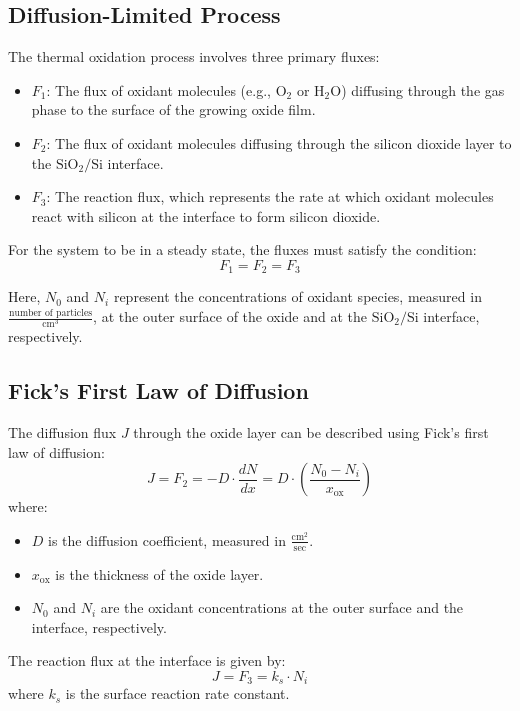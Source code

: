 \documentclass{report}
\begin{document}
\subsection{Diffusion-Limited Process}

The thermal oxidation process involves three primary fluxes:

\begin{itemize}
    \item $F_1$: The flux of oxidant molecules (e.g., $\text{O}_2$ or $\text{H}_2\text{O}$) diffusing through the gas phase to the surface of the growing oxide film.
    \item $F_2$: The flux of oxidant molecules diffusing through the silicon dioxide layer to the $\text{SiO}_2/\text{Si}$ interface.
    \item $F_3$: The reaction flux, which represents the rate at which oxidant molecules react with silicon at the interface to form silicon dioxide.
\end{itemize}

For the system to be in a steady state, the fluxes must satisfy the condition:
$$
F_1 = F_2 = F_3
$$

Here, $N_0$ and $N_i$ represent the concentrations of oxidant species, measured in $\frac{\text{number of particles}}{\text{cm}^3}$, at the outer surface of the oxide and at the $\text{SiO}_2/\text{Si}$ interface, respectively.

\subsection{Fick's First Law of Diffusion}

The diffusion flux $J$ through the oxide layer can be described using Fick's first law of diffusion:
$$
J = F_2 = -D \cdot \frac{dN}{dx} = D \cdot \left(\frac{N_0 - N_i}{x_{\text{ox}}}\right)
$$
where:
\begin{itemize}
    \item $D$ is the diffusion coefficient, measured in $\frac{\text{cm}^2}{\text{sec}}$.
    \item $x_{\text{ox}}$ is the thickness of the oxide layer.
    \item $N_0$ and $N_i$ are the oxidant concentrations at the outer surface and the interface, respectively.
\end{itemize}

The reaction flux at the interface is given by:
$$
J = F_3 = k_s \cdot N_i
$$
where $k_s$ is the surface reaction rate constant.
\end{document}
